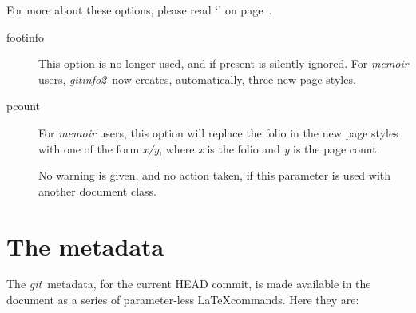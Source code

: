 \documentclass[draft,a4paper,12pt,twoside,openany]{memoir}
\newcommand{\sfit}[1]{\textit{#1}}
\newcommand{\git}{\sfit{git}}
\newcommand{\tpname}{\sfit{gitinfo2}}
\begin{document}
For more about these options, 
please read
`'
on page~\pageref*{sect:memuser}.

\begin{description}

\item[footinfo]
This option is no longer used, and if present is silently ignored.
For \sfit{memoir} users, \tpname\ now creates, automatically,
three new page styles.

\item[pcount]
For \sfit{memoir} users, this option will replace the folio
in the new page styles with one of the form \textit{x/y},
where \textit{x} is the folio and \textit{y} is the page count.

No warning is given, and no action taken,
if this parameter is used with another document class.

\end{description}
\clearpage
\section{The metadata}
The \git\ metadata, for the current HEAD commit,
is made available in the document
as a series of parameter-less \LaTeX commands.
Here they are:
\end{document}

